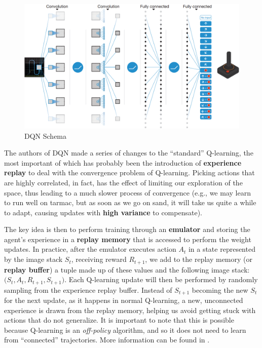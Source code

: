 \begin{figure}
    \centering
    \includegraphics[scale=0.4]{Images/Chapter 7/ataridqn.png}
    \caption{DQN Schema}
    \label{fig:ch7-dqnschema}
\end{figure}

The authors of DQN made a series of changes to the ``standard'' Q-learning, the most important of which has probably been the introduction of \textbf{experience replay} to deal with the convergence problem of Q-learning. Picking actions that are highly correlated, in fact, has the effect of limiting our exploration of the space, thus leading to a much slower process of convergence (e.g., we may learn to run well on tarmac, but as soon as we go on sand, it will take us quite a while to adapt, causing updates with \textbf{high variance} to compensate).

The key idea is then to perform training through an \textbf{emulator} and storing the agent’s experience in a \textbf{replay memory} that is accessed to perform the weight updates. In practice, after the emulator executes action $A_t$ in a state represented by the image stack $S_t$, receiving reward $R_{t+1}$, we add to the replay memory (or \textbf{replay buffer}) a tuple made up of these values and the following image stack: $\big(S_t,A_t,R_{t+1},S_{t+1}\big)$. Each Q-learning update will then be performed by randomly sampling from the experience replay buffer. Instead of $S_{t+1}$ becoming the new $S_t$ for the next update, as it happens in normal Q-learning, a new, unconnected experience is drawn from the replay memory, helping us avoid getting stuck with actions that do not generalize. It is important to note that this is possible because Q-learning is an \textit{off-policy} algorithm, and so it does not need to learn from ``connected'' trajectories. More information can be found in \cite{10.1007/BF00992699}.